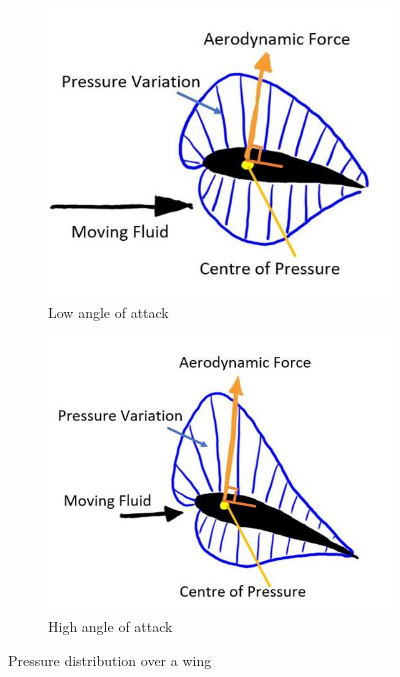 \begin{figure}[H]
     \centering
     \begin{subfigure}[b]{0.45\textwidth}
         \centering
         \includegraphics[width=\textwidth]{02_Background/Figs/smol.JPG}
         \caption{Low angle of attack}
         \label{fig:Press2a}
     \end{subfigure}
     \hfill
     \begin{subfigure}[b]{0.45\textwidth}
         \centering
         \includegraphics[width=\textwidth]{02_Background/Figs/big.JPG}
         \caption{High angle of attack}
         \label{fig:Press2b}
     \end{subfigure}
     \hfill
        \caption{Pressure distribution over a wing }
        \label{fig:pressureWing}
\end{figure}



